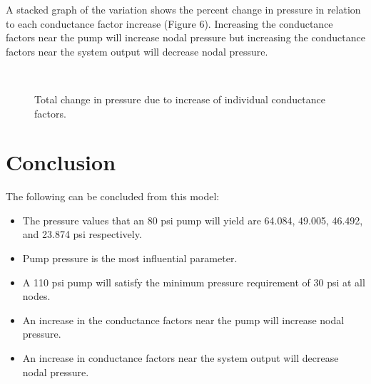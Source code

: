 \documentclass[titlepage,12pt,onehalfspacing]{article}
\begin{document}
A stacked graph of the variation shows the percent change in
pressure in relation to each conductance factor increase (Figure 6).
Increasing the conductance factors near the pump will increase nodal
pressure but increasing the conductance factors near the system
output will decrease nodal pressure.

\begin{figure}[!h]
\begin{center}
 \\
\caption{Total change in pressure due to increase of individual
conductance factors.}
\end{center}
\end{figure}

\section{Conclusion}
The following can be concluded from this model:
\begin{itemize}
\item{The pressure values that an 80 psi pump will yield are 64.084, 49.005, 46.492, and 23.874 psi respectively.}
\item{Pump pressure is the most influential parameter.}
\item{A 110 psi pump will satisfy the minimum pressure requirement
of 30 psi at all nodes.}
\item{An increase in the conductance factors near the pump will
increase nodal pressure.}
\item{An increase in conductance factors near the system output will
decrease nodal pressure.}
\end{itemize}
\end{document}
